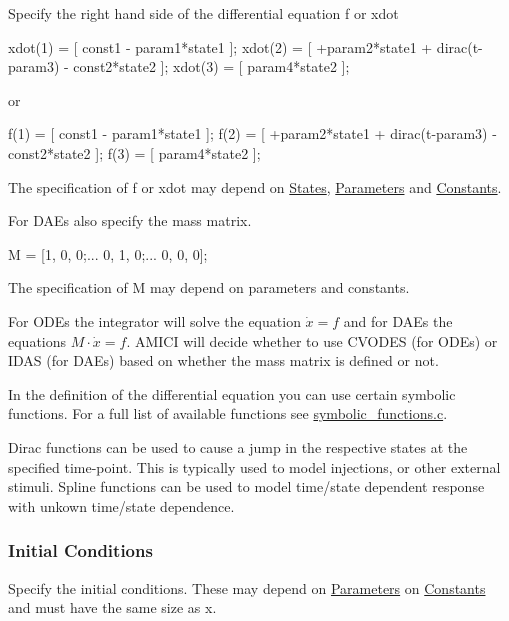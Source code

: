 Specify the right hand side of the differential equation f or xdot


\begin{DoxyCode}
xdot(1) = [ const1 - param1*state1 ];
xdot(2) = [ +param2*state1 + dirac(t-param3) - const2*state2 ];
xdot(3) = [ param4*state2 ];
\end{DoxyCode}


or


\begin{DoxyCode}
f(1) = [ const1 - param1*state1 ];
f(2) = [ +param2*state1 + dirac(t-param3) - const2*state2 ];
f(3) = [ param4*state2 ];
\end{DoxyCode}


The specification of f or xdot may depend on \hyperlink{def_simu_states}{States}, \hyperlink{def_simu_parameters}{Parameters} and \hyperlink{def_simu_constants}{Constants}.

For D\+A\+Es also specify the mass matrix.


\begin{DoxyCode}
M = [1, 0, 0;...
0, 1, 0;...
0, 0, 0];
\end{DoxyCode}


The specification of M may depend on parameters and constants.

For O\+D\+Es the integrator will solve the equation $ \dot{x} = f $ and for D\+A\+Es the equations $ M \cdot \dot{x} = f $. A\+M\+I\+C\+I will decide whether to use C\+V\+O\+D\+E\+S (for O\+D\+Es) or I\+D\+A\+S (for D\+A\+Es) based on whether the mass matrix is defined or not.

In the definition of the differential equation you can use certain symbolic functions. For a full list of available functions see \hyperlink{symbolic__functions_8c}{symbolic\+\_\+functions.\+c}.

Dirac functions can be used to cause a jump in the respective states at the specified time-\/point. This is typically used to model injections, or other external stimuli. Spline functions can be used to model time/state dependent response with unkown time/state dependence.\hypertarget{def_simu_init}{}\subsubsection{Initial Conditions}\label{def_simu_init}
Specify the initial conditions. These may depend on \hyperlink{def_simu_parameters}{Parameters} on \hyperlink{def_simu_constants}{Constants} and must have the same size as x.


